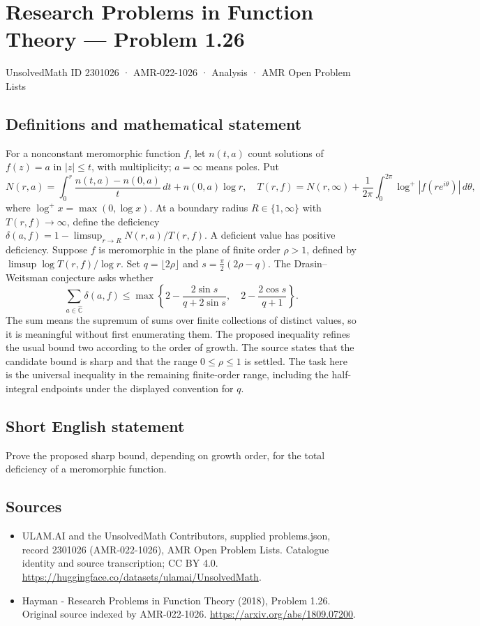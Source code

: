 \documentclass[11pt,a4paper]{article}
\begin{document}
\section*{Research Problems in Function Theory — Problem 1.26}\label{2301026}
{\small UnsolvedMath ID 2301026 · AMR-022-1026 · Analysis · AMR Open Problem Lists}
\subsection{Definitions and mathematical statement}
For a nonconstant meromorphic function $f$, let $n(t,a)$ count solutions of $f(z)=a$ in $|z|\le t$, with multiplicity; $a=\infty$ means poles. Put
\[
N(r,a)=\int_0^r\frac{n(t,a)-n(0,a)}t\,dt+n(0,a)\log r,
\quad T(r,f)=N(r,\infty)+\frac1{2\pi}\int_0^{2\pi}\log^+|f(re^{i\theta})|\,d\theta,
\]
where $\log^+x=\max(0,\log x)$. At a boundary radius $R\in\{1,\infty\}$ with $T(r,f)\to\infty$, define the deficiency
$\delta(a,f)=1-\limsup_{r\to R}N(r,a)/T(r,f)$. A deficient value has positive deficiency.
Suppose $f$ is meromorphic in the plane of finite order $\rho>1$, defined by $\limsup\log T(r,f)/\log r$. Set $q=\lfloor2\rho\rfloor$ and $s=\frac\pi2(2\rho-q)$. The Drasin--Weitsman conjecture asks whether
\[
\sum_{a\in\widehat{\mathbb C}}\delta(a,f)
\le \max\left\{2-\frac{2\sin s}{q+2\sin s},\quad
2-\frac{2\cos s}{q+1}\right\}.
\]
The sum means the supremum of sums over finite collections of distinct values, so it is meaningful without first enumerating them. The proposed inequality refines the usual bound two according to the order of growth. The source states that the candidate bound is sharp and that the range $0\le\rho\le1$ is settled. The task here is the universal inequality in the remaining finite-order range, including the half-integral endpoints under the displayed convention for $q$.
\subsection{Short English statement}
Prove the proposed sharp bound, depending on growth order, for the total deficiency of a meromorphic function.
\subsection{Sources}
\begin{itemize}
\item[S1] ULAM.AI and the UnsolvedMath Contributors, supplied problems.json, record 2301026 (AMR-022-1026), AMR Open Problem Lists. Catalogue identity and source transcription; CC BY 4.0.
\url{https://huggingface.co/datasets/ulamai/UnsolvedMath}.
\item[S2] Hayman - Research Problems in Function Theory (2018), Problem 1.26. Original source indexed by AMR-022-1026.
\url{https://arxiv.org/abs/1809.07200}.
\end{itemize}
\end{document}
